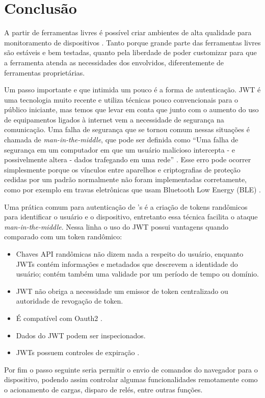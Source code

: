 \section{Conclusão}\label{conclusuxe3o}

A partir de ferramentas livres é possível criar ambientes de alta
qualidade para monitoramento de dispositivos \iot. Tanto porque grande
parte das ferramentas livres são estáveis e bem testadas, quanto pela
liberdade de poder customizar para que a ferramenta atenda as
necessidades dos envolvidos, diferentemente de ferramentas
proprietárias.

Um passo importante e que intimida um pouco é a forma de autenticação.
JWT é uma tecnologia muito recente e utiliza técnicas pouco
convencionais para o público iniciante, mas temos que levar em conta que
junto com o aumento do uso de equipamentos ligados à internet vem a
necessidade de segurança na comunicação. Uma falha de segurança que se
tornou comum nessas situações é chamada de \emph{man-in-the-middle}, que
pode ser definida como ``Uma falha de segurança em um computador em que
um usuário malicioso intercepta - e possivelmente altera - dados
trafegando em uma rede'' \cite{wordspy:2002}. Esse erro pode ocorrer
simplesmente porque os vínculos entre aparelhos e criptografias de
proteção cedidas por um padrão normalmente não foram implementadas
corretamente, como por exemplo em travas eletrônicas que usam Bluetooth
Low Energy (BLE) \cite{spring:2016}.

Uma prática comum para autenticação de \iot's é a criação de tokens
randômicos para identificar o usuário e o dispositivo, entretanto essa
técnica facilita o ataque \emph{man-in-the-middle}. Nessa linha o uso do
JWT possui vantagens quando comparado com um token randômico:

\begin{itemize}
\itemsep1pt\parskip0pt
\item
  Chaves API randômicas não dizem nada a respeito do usuário, enquanto
  JWTs contém informações e metadados que descrevem a identidade do
  usuário; contém também uma validade por um período de tempo ou
  domínio.
\item
  JWT não obriga a necessidade um emissor de token centralizado ou
  autoridade de revogação de token.
\item
  É compatível com Oauth2 \cite{oauth2:2012}.
\item
  Dados do JWT podem ser inspecionados.
\item
  JWTs possuem controles de expiração \cite{romero:2015}.
\end{itemize}

Por fim o passo seguinte seria permitir o envio de comandos do navegador
para o dispositivo, podendo assim controlar algumas funcionalidades
remotamente como o acionamento de cargas, disparo de relés, entre outras
funções.
